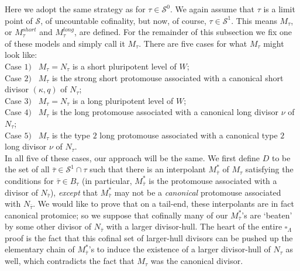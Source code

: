 \documentclass[12pt]{article}
\begin{document}
Here we adopt the same strategy as for $\tau \in \mathcal{S}^0$.  We again assume that $\tau$ is a limit point of $\mathcal{S}$, of uncountable cofinality, but now, of course, $\tau \in \mathcal{S}^1$.  This means $M_\tau$, or  $M_\tau^{short}$ and $M_\tau^{long} $, are defined.  For the remainder of this subsection we fix one of these models and simply call it $M_\tau$.  There are five cases for what $M_\tau$ might look like:\\

Case $1)$ \ $M_\tau = N_\tau$ is a short pluripotent level of $W$;\\

Case $2)$ \ $M_\tau$ is the strong short protomouse associated with a canonical short divisor $(\kappa , q)$ of $N_\tau$;\\

Case $3)$ \ $M_\tau = N_\tau$ is a long pluripotent level of $W$;\\

Case $4)$ \ $M_\tau$ is the long protomouse associated with a canonical long divisor $\nu$ of $N_\tau$;\\

Case $5)$ \ $M_\tau$ is the type $2$ long protomouse associated with a canonical type $2$ long divisor $\nu$ of $N_\tau$.\\


In all five of these cases, our approach will be the same.  We first define $D$ to be the set of all $\bar{\tau} \in \mathcal{S}^1 \cap \tau$ such that there is an interpolant $M^*_{\bar{\tau}}$ of $M_\tau$ satisfying the conditions for $\bar{\tau} \in B_\tau$ (in particular, $M^*_{\bar{\tau}}$ is the protomouse associated with a divisor of $N_{\bar{\tau}}$), \textit{except} that $M^*_{\bar{\tau}}$ may not be a \textit{canonical} protomouse associated with $N_{\bar{\tau}}$.  We would like to prove that on a tail-end, these interpolants are in fact canonical protomice; so we suppose that cofinally many of our $M^*_{\bar{\tau}}$'s are `beaten' by some other divisor of $N_{\bar{\tau}}$ with a larger divisor-hull.  The heart of the entire $\square_\Lambda$ proof is the fact that this cofinal set of larger-hull divisors can be pushed up the elementary chain of $M^*_{\bar{\tau}}$'s to induce the existence of a larger divisor-hull of $N_\tau$ as well, which contradicts the fact that $M_\tau$ was the canonical divisor.\\
\end{document}
